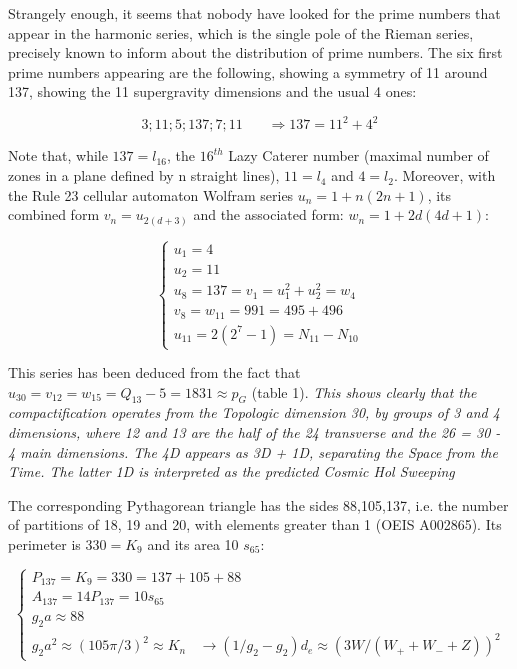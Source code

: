 \documentclass[a4paper,9pt]{article}
\newcounter{row}
\begin{document}
Strangely enough, it seems that nobody have looked for the prime numbers that appear in the harmonic series, which is the single pole of the Rieman series, precisely known to inform about the distribution of prime numbers. The six first prime numbers appearing are the following, showing a symmetry of 11 around 137, showing the 11 supergravity dimensions and the usual 4 ones:

\begin{equation}\label{Eq35}
3; 11; 5; 137; 7; 11   ~~~~~~~~ \Rightarrow 137 = 11^2 + 4^2 
 \end{equation}

Note that, while $137 = l_{16}$, the $16^{th}$ Lazy Caterer number (maximal number of zones in a plane defined by n straight lines), $11 = l_4$ and $4 = l_2$. Moreover, with the Rule 23 cellular automaton Wolfram series $u_n = 1 + n(2n+1)$, its combined form $v_n = u_{2(d+3)}$ and the associated form: $w_n = 1 + 2d(4d+1)$:

\begin{equation}
 \left\{
    \begin{array}{ll}
  u_1 = 4 \\
 u_2 = 11\\
 u_8 = 137 = v_1 = u_1^2 + u_2^2 = w_4 \\

 v_8 = w_{11} = 991 = 495 + 496 \\
 u_{11} = 2 (2^7-1) = N_{11} -N_{10}
    \end{array}
\right.
\end{equation}

This series has been deduced from the fact that $u_30 = v_{12} = w_{15} = Q_{13}-5  = 1831 \approx p_G$ (table 1). \textit{This shows clearly that the compactification operates from the Topologic dimension 30, by groups of 3 and 4 dimensions, where 12 and 13 are the half of the 24 transverse and the 26 = 30 - 4 main dimensions. The 4D appears as 3D + 1D, separating the Space from the Time. The latter 1D is interpreted as the predicted Cosmic Hol Sweeping \cite {Sanchez1}} 

The corresponding Pythagorean triangle has the sides 88,105,137, i.e. the number of partitions of 18, 19 and 20, with elements greater than 1 (OEIS A002865). Its perimeter is $330 = K_9$ and its area 10 $s_{65}$:


\begin{equation}
 \left\{
    \begin{array}{ll}
   P_{137} = K_9 = 330 = 137 + 105 + 88 \\
 A_{137}  = 14 P_{137} = 10 s_{65} \\
g_2 a \approx 88  \\
g_2 a^2 \approx (105 \pi/3)^2 \approx K_n  ~~~~ \rightarrow (1/g_2 - g_2)d_e \approx (3W/(W_+ + W_- + Z))^2 
    \end{array}
\right.
\end{equation}
\end{document}
